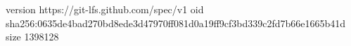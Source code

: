 version https://git-lfs.github.com/spec/v1
oid sha256:0635de4bad270bd8ede3d47970ff081d0a19ff9cf3bd339c2fd7b66e1665b41d
size 1398128
